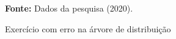 \begin{figure}[ht!]
\centering

\caption{\textmd{Exercício com erro na árvore de distribuição}}
\label{fig:errodevesp}

\par\medskip\textbf{Fonte:} Dados da pesquisa (2020). \par\medskip

\end{figure}

